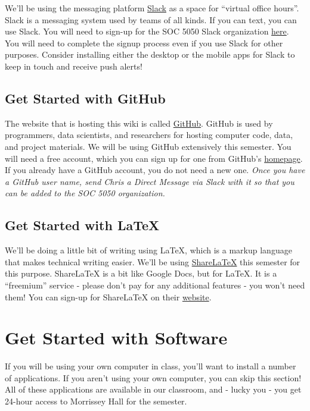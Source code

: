 \documentclass[]{book}
\theoremstyle{definition}
\theoremstyle{definition}
\theoremstyle{remark}
\begin{document}
We'll be using the messaging platform \href{https://slack.com}{Slack} as
a space for ``virtual office hours''. Slack is a messaging system used
by teams of all kinds. If you can text, you can use Slack. You will need
to sign-up for the SOC 5050 Slack organization
\href{https://join.slack.com/t/slu-soc5050/signup}{here}. You will need
to complete the signup process even if you use Slack for other purposes.
Consider installing either the desktop or the mobile apps for Slack to
keep in touch and receive push alerts!

\subsection{Get Started with GitHub}\label{get-started-with-github}

The website that is hosting this wiki is called
\href{https://github.com/}{GitHub}. GitHub is used by programmers, data
scientists, and researchers for hosting computer code, data, and project
materials. We will be using GitHub extensively this semester. You will
need a free account, which you can sign up for one from GitHub's
\href{https://github.com/}{homepage}. If you already have a GitHub
account, you do not need a new one. \emph{Once you have a GitHub user
name, send Chris a Direct Message via Slack with it so that you can be
added to the SOC 5050 organization.}

\subsection{Get Started with LaTeX}\label{get-started-with-latex}

We'll be doing a little bit of writing using LaTeX, which is a markup
language that makes technical writing easier. We'll be using
\href{https://www.sharelatex.com}{ShareLaTeX} this semester for this
purpose. ShareLaTeX is a bit like Google Docs, but for LaTeX. It is a
``freemium'' service - please don't pay for any additional features -
you won't need them! You can sign-up for ShareLaTeX on their
\href{https://www.sharelatex.com}{website}.

\section{Get Started with Software}\label{get-started-with-software}

If you will be using your own computer in class, you'll want to install
a number of applications. If you aren't using your own computer, you can
skip this section! All of these applications are available in our
classroom, and - lucky you - you get 24-hour access to Morrissey Hall
for the semester.
\end{document}
